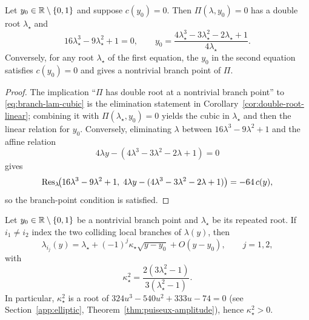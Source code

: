 \begin{theorem}\label{thm:branch-param}
Let $y_0\in\mathbb{R}\setminus\{0,1\}$ and suppose $c(y_0)=0$. Then $\Pi(\lambda,y_0)=0$ has a double root $\lambda_\star$ and
\begin{equation}\label{eq:branch-lam-cubic}
16\lambda_\star^3-9\lambda_\star^2+1=0,\qquad
y_0=\frac{4\lambda_\star^3-3\lambda_\star^2-2\lambda_\star+1}{4\lambda_\star}.
\end{equation}
Conversely, for any root $\lambda_\star$ of the first equation, the $y_0$ in the second equation satisfies $c(y_0)=0$ and gives a nontrivial branch point of $\Pi$.
\begin{proof}
The implication ``$\Pi$ has double root at a nontrivial branch point'' to \eqref{eq:branch-lam-cubic} is the elimination statement in Corollary~\ref{cor:double-root-linear}; combining it with \(\Pi(\lambda_\star,y_0)=0\) yields the cubic in \(\lambda_\star\) and then the linear relation for \(y_0\).
Conversely, eliminating \(\lambda\) between \(16\lambda^3-9\lambda^2+1\) and the affine relation
\[
4\lambda y-(4\lambda^3-3\lambda^2-2\lambda+1)=0
\]
gives
\[
\operatorname{Res}_\lambda\!\bigl(16\lambda^3-9\lambda^2+1,\;4\lambda y-(4\lambda^3-3\lambda^2-2\lambda+1)\bigr)=-64\,c(y),
\]
so the branch-point condition is satisfied.
\end{proof}
\end{theorem}

\begin{theorem}\label{thm:branch-puiseux-sign}
Let \(y_0\in\mathbb{R}\setminus\{0,1\}\) be a nontrivial branch point and \(\lambda_\star\) be its repeated root.
If \(i_1\neq i_2\) index the two colliding local branches of \(\lambda(y)\), then
\[
\lambda_{i_j}(y)=\lambda_\star+(-1)^j\kappa_\star \sqrt{y-y_0}+O(y-y_0),\qquad j=1,2,
\]
with
\begin{equation}\label{eq:kappa-formula-main}
\kappa_\star^2=\frac{2(3\lambda_\star^2-1)}{3(\lambda_\star^2-1)}.
\end{equation}
In particular, $\kappa_\star^2$ is a root of \(324u^3-540u^2+333u-74=0\) (see Section~\ref{app:elliptic}, Theorem~\ref{thm:puiseux-amplitude}), hence \(\kappa_\star^2>0\).
\end{theorem}

